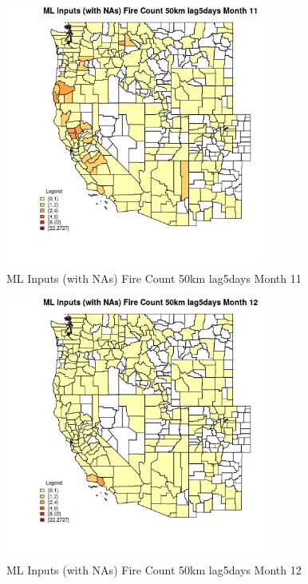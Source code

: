 \begin{figure} 
\centering  
\includegraphics[width=0.77\textwidth]{Code_Outputs/Report_ML_input_PM25_Step4_part_f_de_duplicated_aves_prioritize_24hr_obswNAs_CountyFire_Count_50km_lag5daysmedianMonth11.jpg} 
\caption{\label{fig:Report_ML_input_PM25_Step4_part_f_de_duplicated_aves_prioritize_24hr_obswNAsCountyFire_Count_50km_lag5daysmedianMonth11}ML Inputs (with NAs) Fire Count 50km lag5days Month 11} 
\end{figure} 
 

\begin{figure} 
\centering  
\includegraphics[width=0.77\textwidth]{Code_Outputs/Report_ML_input_PM25_Step4_part_f_de_duplicated_aves_prioritize_24hr_obswNAs_CountyFire_Count_50km_lag5daysmedianMonth12.jpg} 
\caption{\label{fig:Report_ML_input_PM25_Step4_part_f_de_duplicated_aves_prioritize_24hr_obswNAsCountyFire_Count_50km_lag5daysmedianMonth12}ML Inputs (with NAs) Fire Count 50km lag5days Month 12} 
\end{figure} 
 

